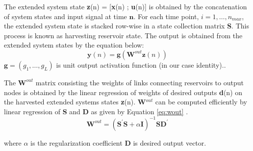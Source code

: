  The extended system state \textbf{z}(n) = [\textbf{x}(n) ; \textbf{u}(n)] is obtained 
 by the concatenation of system states and input signal at time $\mathbf{n}$. For each time point, $i = 1,\hdots ,n_{max}$, the extended system state is stacked row-wise in a state collection matrix \textbf{S}. This process is known as harvesting reservoir state. The output is 
 obtained from the extended system states by the equation below:
 \begin{equation} \label{eq:prediction}
   \mathbf{y}(n) = \mathbf{g}(\mathbf{W}^{out} \mathbf{z}(n) )
 \end{equation}
   $\mathbf{g} = (g_1, \hdots,g_L)$ is unit output activation function (in our case identity).\cite{Jaeger:2007}.
  
   The $\textbf{W}^{out}$ matrix consisting the weights of links connecting reservoirs to output nodes is obtained by the linear 
   regression of weights of desired outputs \textbf{d}(n) on the harvested 
   extended systems states \textbf{z}(n). \textbf{W}$^{out}$ can be computed 
   efficiently by linear regression of \textbf{S} and \textbf{D} as given by Equation \eqref{eq:wout} .
   \begin{equation}\label{eq:wout}
 	\mathbf{W}^{out} =
      (\mathbf{S^{'}S} + \alpha \mathbf{I})^{-1}\mathbf{SD}^{'}
      \end{equation}
     
      where $\alpha$ is the regularization coefficient \textbf{D} is 
      desired output vector\cite{Jaeger:2007}.
